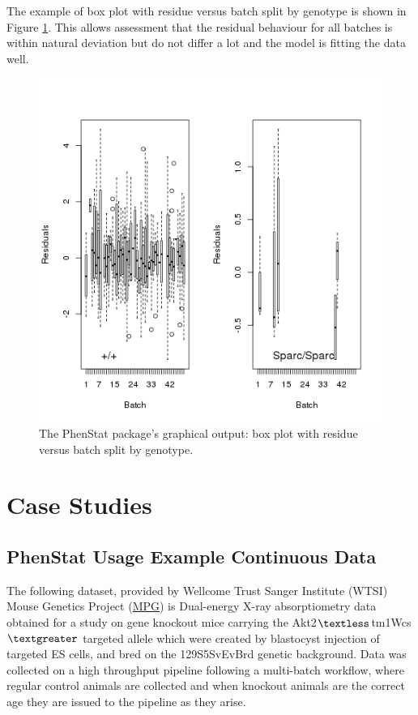 \documentclass[12pt,a4paper]{article}
\begin{document}
The example of box plot with residue versus batch split by genotype is shown in Figure \ref{fig:13}. This allows assessment that the residual behaviour for all batches is within natural deviation but do not differ a lot and the model is fitting the data well.
\begin{figure}[!htpb]%
\centerline{\includegraphics[scale=0.5]{boxplotResidualBatch.png}}
\caption{The PhenStat package's graphical output: box plot with residue versus batch split by genotype.}\label{fig:13}
\end{figure}
   
\section{Case Studies}
\subsection{PhenStat Usage Example Continuous Data}
The following dataset, provided by Wellcome Trust Sanger Institute (WTSI) Mouse Genetics Project (\href{http://www.sanger.ac.uk/resources/mouse/}{MPG}) 
is Dual-energy X-ray absorptiometry data obtained for a study on gene knockout mice carrying the Akt2$\textless$tm1Wcs$\textgreater$ targeted allele which were created by blastocyst 
injection of targeted ES cells, and bred on the 129S5\/SvEvBrd genetic background.  
Data was collected on a high throughput pipeline following a multi-batch workflow, where regular control animals are collected and when knockout animals are the correct age they are issued to the pipeline as they arise.  
\end{document}

